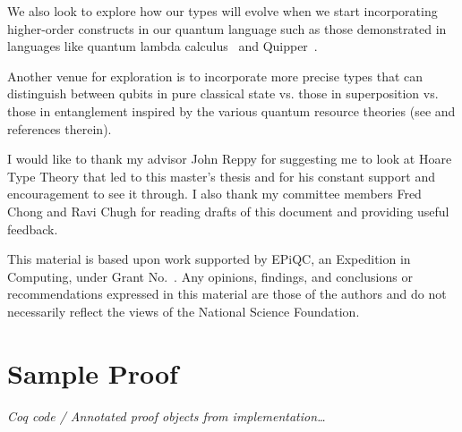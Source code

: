 \documentclass[acmsmall,nonacm,timestamp]{acmart}
\begin{document}
We also look to explore how our types will evolve when we start incorporating higher-order constructs in our quantum language such as those demonstrated in languages like quantum lambda calculus~\cite{selinger_lambda_2006} and Quipper~\cite{green_quipper:_2013}.

Another venue for exploration is to incorporate more precise types that can distinguish between qubits in pure classical state vs. those in superposition vs. those in entanglement inspired by the various quantum resource theories (see \cite{rand_type_2019} and references therein).

\begin{acks}
	I would like to thank my advisor John Reppy for suggesting me to look at Hoare Type Theory that led to this master's thesis and for his constant support and encouragement to see it through. I also thank my committee members Fred Chong and Ravi Chugh for reading drafts of this document and providing useful feedback.

	This material is based upon work supported by
	EPiQC, an 
	Expedition in Computing, under Grant
	No.~.  Any opinions, findings, and
	conclusions or recommendations expressed in this material are those
	of the authors and do not necessarily reflect the views of the
	National Science Foundation.
\end{acks}

\newpage



\newpage

\appendix
\section{Sample Proof}
\textit{Coq code / Annotated proof objects from implementation\ldots}
\end{document}
